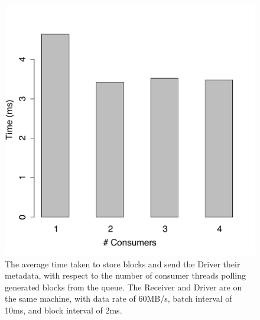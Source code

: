 \begin{figure}[t!]
 \begin{center}
   \includegraphics[scale=0.40]{images_graphs/optimizations/graph4/consumers_optimization_illus.pdf}
 \end{center}
 \caption{The average time taken to store blocks and send the Driver their metadata, with respect to the number of consumer threads polling generated blocks from the queue. The Receiver and Driver are on the same machine, with data rate of 60MB/s, batch interval of 10ms, and block interval of 2ms.}
 \label{fig:consumers_optimization_illus}
\end{figure}
